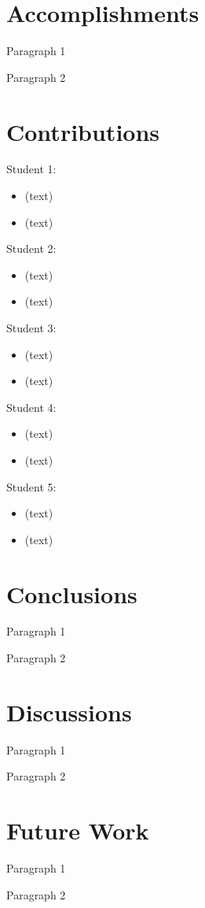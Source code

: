 \documentclass[12pt, a4paper]{report}
\begin{document}
\section{Accomplishments}
Paragraph 1

Paragraph 2

\section{Contributions}
Student 1:
\begin{itemize}
  \item (text)
  \item (text)
\end{itemize}
Student 2:
\begin{itemize}
  \item (text)
  \item (text)
\end{itemize}
Student 3:
\begin{itemize}
  \item (text)
  \item (text)
\end{itemize}
Student 4:
\begin{itemize}
  \item (text)
  \item (text)
\end{itemize}
Student 5:
\begin{itemize}
  \item (text)
  \item (text)
\end{itemize}

\section{Conclusions}
Paragraph 1

Paragraph 2

\section{Discussions}
Paragraph 1

Paragraph 2

\section{Future Work}
Paragraph 1

Paragraph 2
\end{document}
